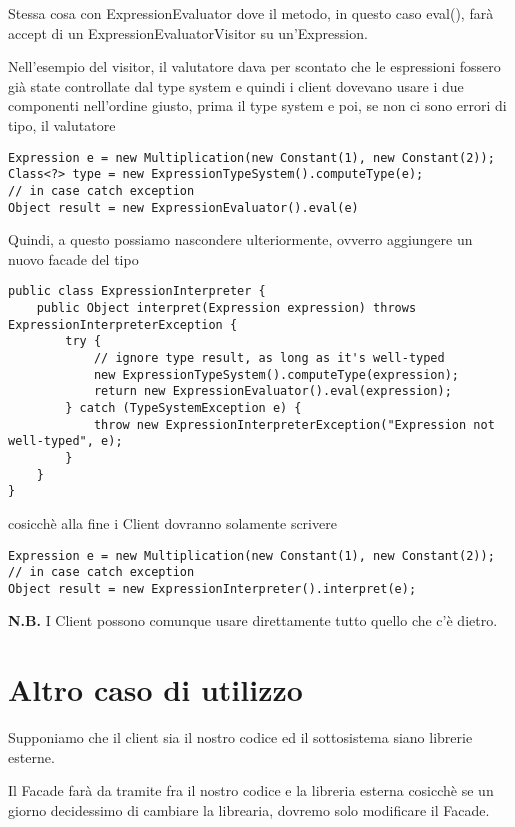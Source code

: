 Stessa cosa con ExpressionEvaluator dove il metodo, in questo caso eval(), farà accept di un ExpressionEvaluatorVisitor su un'Expression.

Nell'esempio del visitor, il valutatore dava per scontato che le espressioni fossero già state controllate dal type system e quindi i client dovevano usare i due 
componenti nell’ordine giusto, prima il type system e poi, se non ci sono errori di tipo, il valutatore
\begin{lstlisting}
Expression e = new Multiplication(new Constant(1), new Constant(2));
Class<?> type = new ExpressionTypeSystem().computeType(e);
// in case catch exception
Object result = new ExpressionEvaluator().eval(e)
\end{lstlisting}

Quindi, a questo possiamo nascondere ulteriormente, ovverro aggiungere un nuovo facade del tipo
\begin{lstlisting}
public class ExpressionInterpreter {
    public Object interpret(Expression expression) throws ExpressionInterpreterException {
        try {
            // ignore type result, as long as it's well-typed
            new ExpressionTypeSystem().computeType(expression);
            return new ExpressionEvaluator().eval(expression);
        } catch (TypeSystemException e) {
            throw new ExpressionInterpreterException("Expression not well-typed", e);
        }
    }
}
\end{lstlisting}

cosicchè alla fine i Client dovranno solamente scrivere
\begin{lstlisting}
Expression e = new Multiplication(new Constant(1), new Constant(2));
// in case catch exception
Object result = new ExpressionInterpreter().interpret(e);
\end{lstlisting}

\textbf{N.B.} I Client possono comunque usare direttamente tutto quello che c'è dietro.

\section{Altro caso di utilizzo}

Supponiamo che il client sia il nostro codice ed il sottosistema siano librerie esterne.

Il Facade farà da tramite fra il nostro codice e la libreria esterna cosicchè se un giorno decidessimo di cambiare la librearia, dovremo solo modificare il Facade.